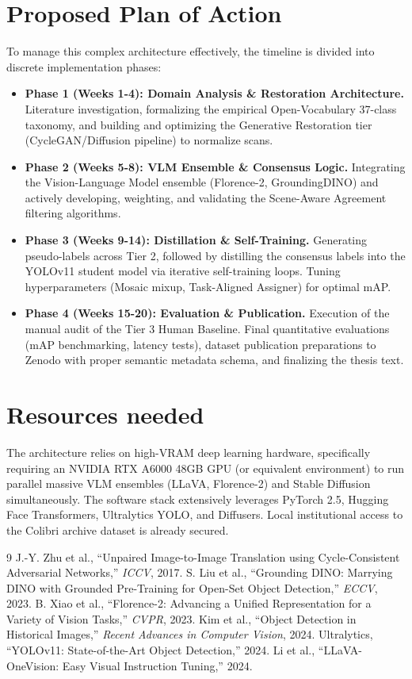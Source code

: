 \documentclass[a4paper, 11pt]{article}
\begin{document}
\section*{Proposed Plan of Action}
To manage this complex architecture effectively, the timeline is divided into discrete implementation phases:
\begin{itemize}
    \item \textbf{Phase 1 (Weeks 1-4): Domain Analysis \& Restoration Architecture.} Literature investigation, formalizing the empirical Open-Vocabulary 37-class taxonomy, and building and optimizing the Generative Restoration tier (CycleGAN/Diffusion pipeline) to normalize scans.
    \item \textbf{Phase 2 (Weeks 5-8): VLM Ensemble \& Consensus Logic.} Integrating the Vision-Language Model ensemble (Florence-2, GroundingDINO) and actively developing, weighting, and validating the Scene-Aware Agreement filtering algorithms.
    \item \textbf{Phase 3 (Weeks 9-14): Distillation \& Self-Training.} Generating pseudo-labels across Tier 2, followed by distilling the consensus labels into the YOLOv11 student model via iterative self-training loops. Tuning hyperparameters (Mosaic mixup, Task-Aligned Assigner) for optimal mAP.
    \item \textbf{Phase 4 (Weeks 15-20): Evaluation \& Publication.} Execution of the manual audit of the Tier 3 Human Baseline. Final quantitative evaluations (mAP benchmarking, latency tests), dataset publication preparations to Zenodo with proper semantic metadata schema, and finalizing the thesis text.
\end{itemize}

\section*{Resources needed}
The architecture relies on high-VRAM deep learning hardware, specifically requiring an NVIDIA RTX A6000 48GB GPU (or equivalent environment) to run parallel massive VLM ensembles (LLaVA, Florence-2) and Stable Diffusion simultaneously. The software stack extensively leverages PyTorch 2.5, Hugging Face Transformers, Ultralytics YOLO, and Diffusers. Local institutional access to the Colibri archive dataset is already secured.

\begin{thebibliography}{9}
 J.-Y. Zhu et al., ``Unpaired Image-to-Image Translation using Cycle-Consistent Adversarial Networks,'' \emph{ICCV}, 2017.
 S. Liu et al., ``Grounding DINO: Marrying DINO with Grounded Pre-Training for Open-Set Object Detection,'' \emph{ECCV}, 2023.
 B. Xiao et al., ``Florence-2: Advancing a Unified Representation for a Variety of Vision Tasks,'' \emph{CVPR}, 2023.
 Kim et al., ``Object Detection in Historical Images,'' \emph{Recent Advances in Computer Vision}, 2024.
 Ultralytics, ``YOLOv11: State-of-the-Art Object Detection,'' 2024.
 Li et al., ``LLaVA-OneVision: Easy Visual Instruction Tuning,'' 2024.
\end{thebibliography}
\end{document}
